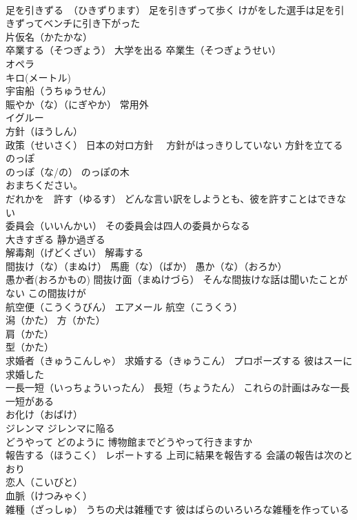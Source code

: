 \documentclass[8pt]{extreport}
\begin{document}
\begin{CJK}{UTF8}{min}
\\	足を引きずる　（ひきずります） 足を引きずって歩く けがをした選手は足を引きずってベンチに引き下がった
\\	片仮名（かたかな）
\\	卒業する（そつぎょう） 大学を出る 卒業生（そつぎょうせい）
\\	オペラ
\\	キロ(メートル)
\\	宇宙船（うちゅうせん）
\\	賑やか（な）（にぎやか） 常用外
\\	イグルー
\\	方針（ほうしん） 
\\	政策（せいさく） 日本の対ロ方針　 方針がはっきりしていない 方針を立てる
\\	のっぽ 
\\	のっぽ（な/の） のっぽの木
\\	おまちください。
\\	だれかを　許す（ゆるす） どんな言い訳をしようとも、彼を許すことはできない
\\	委員会（いいんかい） その委員会は四人の委員からなる
\\	大きすぎる 静か過ぎる
\\	解毒剤（げどくざい） 解毒する
\\	間抜け（な）（まぬけ） 馬鹿（な）（ばか） 愚か（な）（おろか）
\\	愚か者(おろかもの) 間抜け面（まぬけづら） そんな間抜けな話は聞いたことがない この間抜けが
\\	航空便（こうくうびん） エアメール 航空（こうくう）
\\	潟（かた） 方（かた）
\\	肩（かた）
\\	型（かた）
\\	求婚者（きゅうこんしゃ） 求婚する（きゅうこん） プロポーズする 彼はスーに求婚した
\\	一長一短（いっちょういったん） 長短（ちょうたん） これらの計画はみな一長一短がある
\\	お化け（おばけ）
\\	ジレンマ ジレンマに陥る
\\	どうやって どのように 博物館までどうやって行きますか
\\	報告する（ほうこく） レポートする 上司に結果を報告する 会議の報告は次のとおり
\\	恋人（こいびと）
\\	血脈（けつみゃく） 
\\	雑種（ざっしゅ） うちの犬は雑種です 彼はばらのいろいろな雑種を作っている

\end{CJK}
\end{document}
